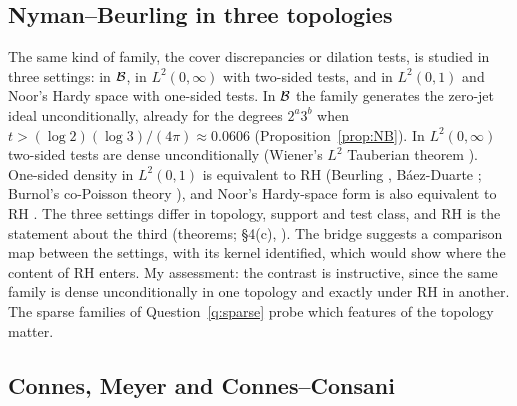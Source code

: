 \subsection{Nyman--Beurling in three topologies}

The same kind of family, the cover discrepancies or dilation tests, is studied in three settings: in $\mathcal{B}$, in $L^2(0,\infty)$ with two-sided tests, and in $L^2(0,1)$ and Noor's Hardy space with one-sided tests. In $\mathcal{B}$ the family generates the zero-jet ideal unconditionally, already for the degrees $2^a3^b$ when $t>(\log2)(\log3)/(4\pi)\approx0.0606$ (Proposition~\ref{prop:NB}). In $L^2(0,\infty)$ two-sided tests are dense unconditionally (Wiener's $L^2$ Tauberian theorem \cite{Wiener}). One-sided density in $L^2(0,1)$ is equivalent to RH (Beurling \cite{Beurling}, Báez-Duarte \cite{BaezDuarte}; Burnol's co-Poisson theory \cite{Burnol}), and Noor's Hardy-space form is also equivalent to RH \cite{Noor}. The three settings differ in topology, support and test class, and RH is the statement about the third (theorems;  §4(c), ).
The bridge suggests a comparison map between the settings, with its kernel identified, which would show where the content of RH enters.
My assessment: the contrast is instructive, since the same family is dense unconditionally in one topology and exactly under RH in another. The sparse families of Question~\ref{q:sparse} probe which features of the topology matter.

\subsection{Connes, Meyer and Connes--Consani}

